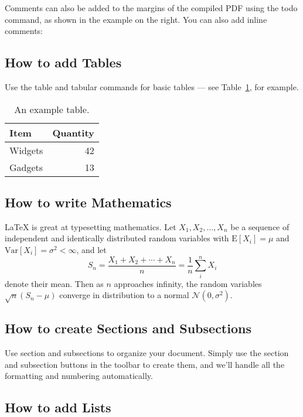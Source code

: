 \documentclass[a4paper]{article}
\begin{document}
Comments can also be added to the margins of the compiled PDF using the todo command, as shown in the example on the right. You can also add inline comments:


\subsection{How to add Tables}

Use the table and tabular commands for basic tables --- see Table~\ref{tab:widgets}, for example. 

\begin{table}
\centering
\begin{tabular}{l|r}
Item & Quantity \\\hline
Widgets & 42 \\
Gadgets & 13
\end{tabular}
\caption{\label{tab:widgets}An example table.}
\end{table}

\subsection{How to write Mathematics}

\LaTeX{} is great at typesetting mathematics. Let $X_1, X_2, \ldots, X_n$ be a sequence of independent and identically distributed random variables with $\text{E}[X_i] = \mu$ and $\text{Var}[X_i] = \sigma^2 < \infty$, and let
\[S_n = \frac{X_1 + X_2 + \cdots + X_n}{n}
= \frac{1}{n}\sum_{i}^{n} X_i\]
denote their mean. Then as $n$ approaches infinity, the random variables $\sqrt{n}(S_n - \mu)$ converge in distribution to a normal $\mathcal{N}(0, \sigma^2)$.


\subsection{How to create Sections and Subsections}

Use section and subsections to organize your document. Simply use the section and subsection buttons in the toolbar to create them, and we'll handle all the formatting and numbering automatically.

\subsection{How to add Lists}
\end{document}

